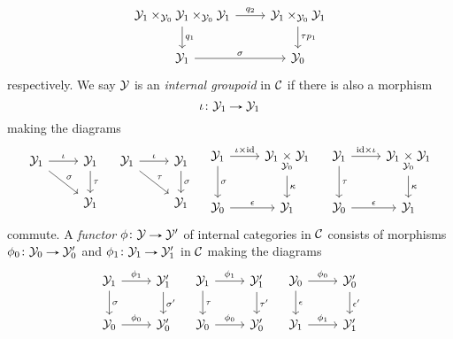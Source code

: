 \begin{appendices}
\begin{definitions}
\[\begin{tikzcd}
      \Y_1 \times_{\Y_0} \Y_1 \times_{\Y_0} \Y_1 \ar[r, "q_2"] \ar[d,
      "q_1"] & \Y_1
      \times_{\Y_0} \Y_1 \ar[d, "\tau p_1"] \\ \Y_1 \ar[r, "\sigma"] &
      \Y_0
    \end{tikzcd}
    \]
    respectively. We say $\mathcal{Y}$ is an \emph{internal groupoid} in $\mathcal{C}$
    if there is also a morphism
    \[
    \iota \c \Y_1 \to \Y_1
    \]
    making the diagrams
    \[
    \begin{tikzcd}
      \Y_1 \ar[r, "\iota"] \ar[rd, "\sigma"] & \Y_1
      \ar[d, "\tau"] \\ & \Y_1
    \end{tikzcd}
    \quad
    \begin{tikzcd}
      \Y_1 \ar[r, "\iota"] \ar[rd, "\tau"] & \Y_1
      \ar[d, "\sigma"] \\ & \Y_1
    \end{tikzcd}
    \quad
    \begin{tikzcd}
      \Y_1 \ar[r, "\iota \times \id"] \ar[d, "\sigma"] & \Y_1
      \underset{\Y_0}{\times} \Y_1 \ar[d, "\kappa"] \\ \Y_0 \ar[r,
      "\epsilon"] & \Y_1
    \end{tikzcd}
    \quad
    \begin{tikzcd}
      \Y_1 \ar[r, "\id \times \iota"] \ar[d, "\tau"] & \Y_1
      \underset{\Y_0}{\times} \Y_1 \ar[d, "\kappa"] \\ \Y_0 \ar[r,
      "\epsilon"] & \Y_1
    \end{tikzcd}
    \]
    commute. A \emph{functor} $\phi \c \Y \to \Y'$ of internal
    categories in $\mathcal{C}$ consists of morphisms $\phi_0 \c \Y_0 \to
    \Y'_0$ and $\phi_1 \c \Y_1 \to \Y'_1$ in $\mathcal{C}$ making the diagrams
    \[
    \begin{tikzcd}
      \Y_1 \ar[r, "\phi_1"] \ar[d, "\sigma"] & \Y'_1 \ar[d, "\sigma'"]
      \\ \Y_0 \ar[r, "\phi_0"] & \Y'_0
    \end{tikzcd}
    \quad
    \begin{tikzcd}
      \Y_1 \ar[r, "\phi_1"] \ar[d, "\tau"] & \Y'_1 \ar[d, "\tau'"]
      \\ \Y_0 \ar[r, "\phi_0"] & \Y'_0
    \end{tikzcd}
    \quad
    \begin{tikzcd}
      \Y_0 \ar[r, "\phi_0"] \ar[d, "\epsilon"] & \Y'_0 \ar[d,
      "\epsilon'"] \\ \Y_1 \ar[r, "\phi_1"] & \Y'_1
    \end{tikzcd}
\]
\end{definitions}
\end{appendices}

